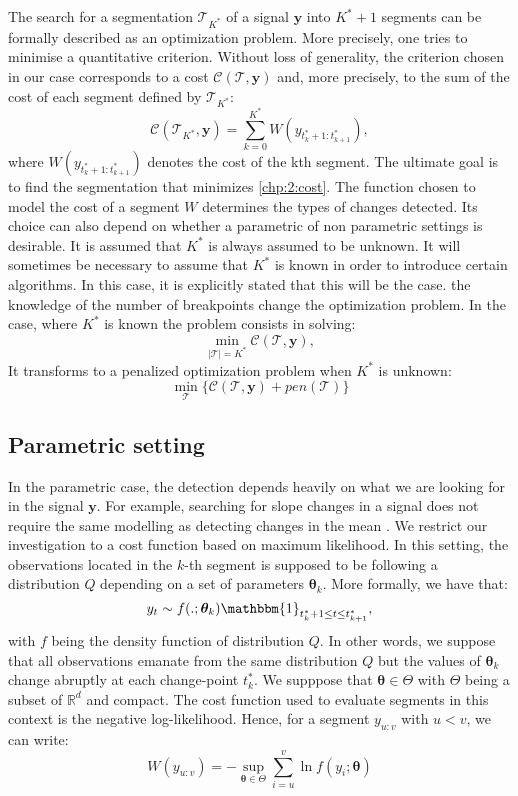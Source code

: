 The search for a segmentation $\mathcal{T}_{K^*}$  of a signal $\bm y$ into $K^*+1$ segments can be formally described as an optimization problem. More precisely, one tries to minimise a quantitative criterion. Without loss of generality, the criterion chosen in our case corresponds to a cost $\mathcal{C}(\mathcal{T},\bm y)$ and, more precisely, to the sum of the cost of each segment defined by $\mathcal{T}_{K^*}$: 
\begin{equation}\label{chp:2:cost}
\mathcal{C}(\mathcal{T}_{K^*},\bm y) = \sum_{k=0}^{K^*} W(y_{t^*_k+1:t^*_{k+1}}),
\end{equation}
where $W(y_{t^*_k+1:t^*_{k+1}})$ denotes the cost of the kth segment. The ultimate goal is to find the segmentation that minimizes \ref{chp:2:cost}. The function chosen to model the cost of a segment $W$ determines the types of changes detected. Its choice can also depend on whether a parametric of non parametric settings is desirable. 
It is assumed that $K^*$ is always assumed to be unknown. It will sometimes be necessary to assume that $K^*$ is known in order to introduce certain algorithms. In this case, it is explicitly stated that this will be the case. the knowledge of the number of breakpoints change the optimization problem. In the case, where $K^*$ is known the problem consists in solving: 
\begin{equation}\label{chp:2:optKnown}
\min_{\lvert\mathcal{T}\rvert = K^*} \mathcal{C}(\mathcal{T},\bm y), 
\end{equation}     
It transforms to a penalized optimization problem when $K^*$ is unknown: 
\begin{equation}\label{chp:2:optnKnown}
\min_{\mathcal{T}} \{ \mathcal{C}(\mathcal{T},\bm y) + pen(\mathcal{T}) \} 
\end{equation}      


\subsection{Parametric setting}

In the parametric case, the detection depends heavily on what we are looking for in the signal $\bm y$. For example, searching for slope changes in a signal \cite{Bai1994,Fearnhead2018} does not require the same modelling as detecting changes in the mean \cite{Frick2014,chen2012parametric}. We restrict our investigation to a cost function based on maximum likelihood. In this setting, the observations located in the $k$-th segment is supposed to be following a distribution $Q$ depending on a set of parameters $\bm \theta_k$. More formally, we have that:
$$y_t \sim f(.;\bm \theta_k)\mathbbm{1}_{t_{k}^*+1\leq t \leq t_{k+1}^*},$$
with $f$ being the density function of distribution $Q$. In other words, we suppose that all observations emanate from the same distribution $Q$ but the values of $\bm \theta_k$ change abruptly at each change-point $t^*_k$. We supppose that $\bm \theta \in \Theta$ with $\Theta$ being a subset of $\mathbb{R}^d$ and compact. 
The cost function used to evaluate segments in this context is the negative log-likelihood. Hence, for a segment $y_{u:v}$ with $u < v$, we can write:  
$$W(y_{u:v}) = -\sup_{\bm \theta \in \Theta} \sum_{i = u}^{v} \ln f(y_i; \bm \theta)$$ 

